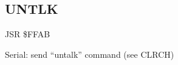 
\newpage
\subsection{UNTLK}
\label{KERNAL Jump Table!UNTLK}
\begin{description}[leftmargin=2cm,style=nextline]
    \item [Address:] JSR \$FFAB
    \item [Description:] Serial: send ``untalk'' command (see CLRCH)
    \item [Inputs:]
    \item [Outputs:]
    \item [Remarks:]
    \item [Example:]
\end{description}



\newpage

